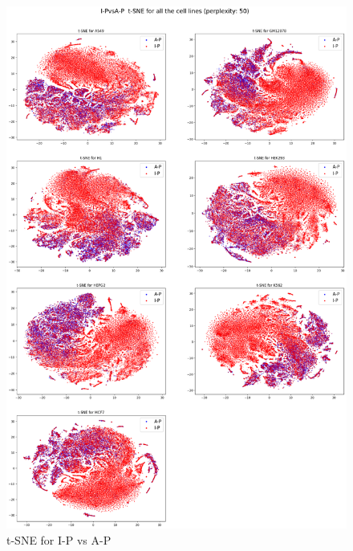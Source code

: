 \begin{figure}[h]
\centering
\includegraphics[width=12cm]{images/tsne_decomp_plots/20200410-232531_I-PvsA-P_tsne_plot.png}
\caption{t-SNE for I-P vs A-P}
\label{fig:tsneIPvsAP}
\end{figure}

